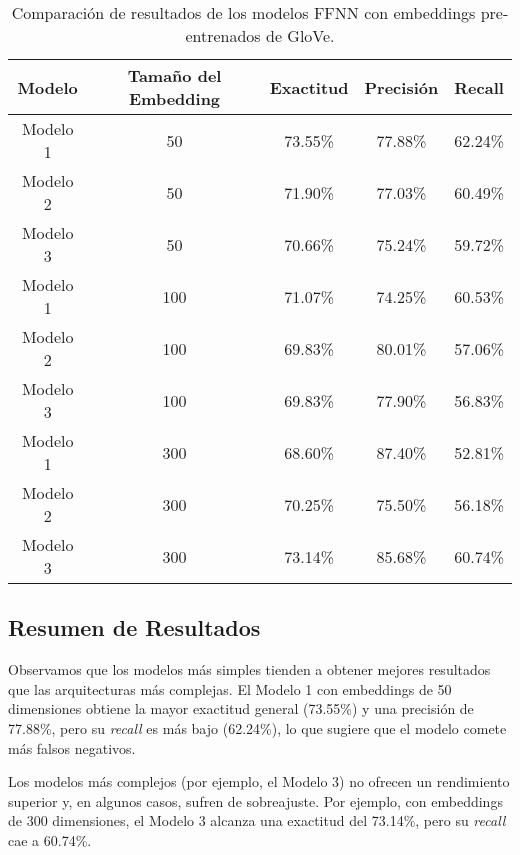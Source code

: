 \documentclass[11pt,english]{article}
\theoremstyle{plain}
\begin{document}
\begin{table}[h!]
\centering
\begin{tabular}{|c|c|c|c|c|}
\hline
\textbf{Modelo} & \textbf{Tamaño del Embedding} & \textbf{Exactitud} & \textbf{Precisión} & \textbf{Recall} \\ \hline
Modelo 1        & 50                            & 73.55\%            & 77.88\%            & 62.24\%         \\ \hline
Modelo 2        & 50                            & 71.90\%            & 77.03\%            & 60.49\%         \\ \hline
Modelo 3        & 50                            & 70.66\%            & 75.24\%            & 59.72\%         \\ \hline
Modelo 1        & 100                           & 71.07\%            & 74.25\%            & 60.53\%         \\ \hline
Modelo 2        & 100                           & 69.83\%            & 80.01\%            & 57.06\%         \\ \hline
Modelo 3        & 100                           & 69.83\%            & 77.90\%            & 56.83\%         \\ \hline
Modelo 1        & 300                           & 68.60\%            & 87.40\%            & 52.81\%         \\ \hline
Modelo 2        & 300                           & 70.25\%            & 75.50\%            & 56.18\%         \\ \hline
Modelo 3        & 300                           & 73.14\%            & 85.68\%            & 60.74\%         \\ \hline
\end{tabular}
\caption{Comparación de resultados de los modelos FFNN con embeddings pre-entrenados de GloVe.}
\end{table}

\subsection*{Resumen de Resultados}

Observamos que los modelos más simples tienden a obtener mejores resultados que las arquitecturas más complejas. El Modelo 1 con embeddings de 50 dimensiones obtiene la mayor exactitud general (73.55\%) y una precisión de 77.88\%, pero su \textit{recall} es más bajo (62.24\%), lo que sugiere que el modelo comete más falsos negativos.

Los modelos más complejos (por ejemplo, el Modelo 3) no ofrecen un rendimiento superior y, en algunos casos, sufren de sobreajuste. Por ejemplo, con embeddings de 300 dimensiones, el Modelo 3 alcanza una exactitud del 73.14\%, pero su \textit{recall} cae a 60.74\%.
\end{document}
